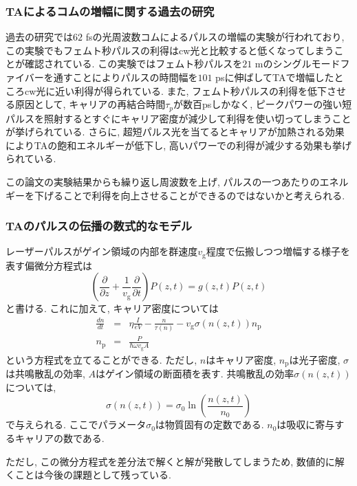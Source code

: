 \documentclass[uplatex, dvipdfmx, a4paper, report, papersize, 11pt]{jsbook}
\begin{document}
\subsubsection{TAによるコムの増幅に関する過去の研究}
過去の研究では$62$ fsの光周波数コムによるパルスの増幅の実験が行われており, この実験でもフェムト秒パルスの利得はcw光と比較すると低くなってしまうことが確認されている\cite{Cruz:06}. この実験ではフェムト秒パルスを$21$ mのシングルモードファイバーを通すことによりパルスの時間幅を$101$ psに伸ばしてTAで増幅したところcw光に近い利得が得られている. また, フェムト秒パルスの利得を低下させる原因として, キャリアの再結合時間$\tau_p$が数百psしかなく, ピークパワーの強い短パルスを照射するとすぐにキャリア密度が減少して利得を使い切ってしまうことが挙げられている. さらに, 超短パルス光を当てるとキャリアが加熱される効果によりTAの飽和エネルギーが低下し, 高いパワーでの利得が減少する効果も挙げられている. \par
この論文の実験結果からも繰り返し周波数を上げ, パルスの一つあたりのエネルギーを下げることで利得を向上させることができるのではないかと考えられる.

\subsubsection{TAのパルスの伝播の数式的なモデル}
レーザーパルスがゲイン領域の内部を群速度$v_\mathrm{g}$程度で伝搬しつつ増幅する様子を表す偏微分方程式は
\begin{equation}
  \left(\frac{\partial}{\partial z} + \frac{1}{v_{\mathrm{g}}}\frac{\partial}{\partial t}\right)P(z,t) = g(z,t)P(z,t)
\end{equation}
と書ける. これに加えて, キャリア密度については
\begin{eqnarray}
  \frac{dn}{dt} &=& \eta \frac{I}{eV} - \frac{n}{\tau(n)}-v_{\mathrm{g}}\sigma(n(z,t))n_{\mathrm{p}}\\
  n_{\mathrm{p}} &=& \frac{P}{\hbar\omega v_{\mathrm{g}}A}
\end{eqnarray}
という方程式を立てることができる. ただし, $n$はキャリア密度, $n_{\mathrm{p}}$は光子密度, $\sigma$は共鳴散乱の効率, $A$はゲイン領域の断面積を表す. 共鳴散乱の効率$\sigma(n(z,t))$については, 　
\begin{equation}
  \sigma(n(z,t)) = \sigma_0 \ln{\left( \frac{n(z,t)}{n_0}\right)}
\end{equation}
で与えられる. ここでパラメータ$\sigma_0$は物質固有の定数である. $n_0$は吸収に寄与するキャリアの数である.

ただし, この微分方程式を差分法で解くと解が発散してしまうため, 数値的に解くことは今後の課題として残っている.
\end{document}
